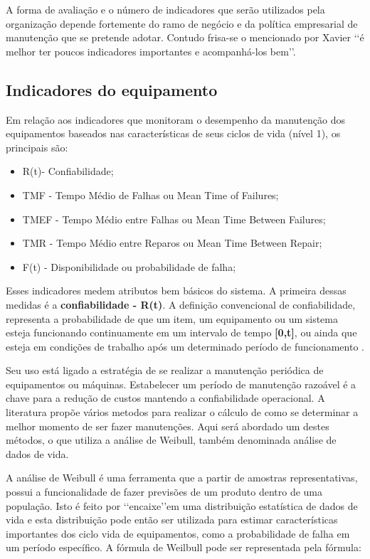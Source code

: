 A forma de avaliação e o número de indicadores que serão utilizados pela organização depende fortemente do ramo de negócio e da política empresarial de manutenção que se pretende adotar. Contudo frisa-se o mencionado por Xavier \cite{xavier2007indicadores} \lq\lq é melhor ter poucos indicadores importantes e acompanhá-los bem\rq\rq.

\subsection{Indicadores do equipamento}
\label{nivel 1}

Em relação aos indicadores que monitoram o desempenho da manutenção dos equipamentos baseados nas características de seus ciclos de vida (nível 1), os principais são:

\begin{itemize}
	\item R(t)- Confiabilidade;
	\item TMF - Tempo Médio de Falhas ou Mean Time of Failures;
	\item TMEF - Tempo Médio entre Falhas ou Mean Time Between Failures;
	\item TMR - Tempo Médio entre Reparos ou Mean Time Between Repair;
	\item F(t) - Disponibilidade ou probabilidade de falha;
	\end{itemize}

Esses indicadores medem atributos bem básicos do sistema. A primeira dessas medidas é a \textbf{confiabilidade - R(t)}. A definição convencional de confiabilidade, representa a probabilidade de que um item, um equipamento ou um sistema esteja funcionando continuamente em um intervalo de tempo \textbf{[0,t]}, ou ainda que esteja em condições de trabalho após um determinado período de funcionamento \cite{tavares1999administraccao}. 

Seu uso está ligado a estratégia de se realizar a manutenção periódica de equipamentos ou máquinas. Estabelecer um período de manutenção razoável é a chave para a redução de custos mantendo a confiabilidade operacional. A literatura propõe vários metodos para realizar o cálculo de como se determinar a melhor momento de ser fazer manutenções. Aqui será abordado um destes métodos, o que utiliza a análise de Weibull, também denominada análise de dados de vida.

A análise de Weibull é uma ferramenta que a partir de amostras representativas, possui a funcionalidade de fazer previsões de um produto dentro de uma população.  Isto é feito por \lq\lq encaixe\rq\rq em uma distribuição estatística de dados de vida e esta distribuição pode então ser utilizada para estimar características importantes dos ciclo vida de equipamentos, como a probabilidade de falha em um período específico. A fórmula de Weilbull pode ser representada pela fórmula:

